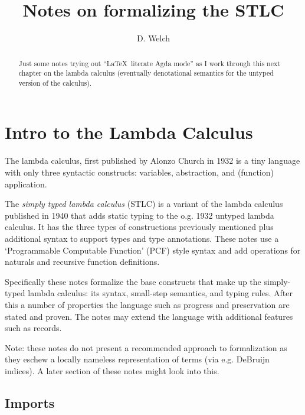 \documentclass[runningheads]{llncs}
\begin{document}
\title{Notes on formalizing the STLC}
\author{D. Welch}
\institute{}
\maketitle

\begin{abstract}
Just some notes trying out ``\LaTeX \ literate Agda mode'' as I work through 
this next chapter on the lambda calculus (eventually denotational semantics for
the untyped version of the calculus).
\end{abstract}

\section{Intro to the Lambda Calculus} 

The lambda calculus, first published by Alonzo Church in 1932 is a tiny language 
with only three syntactic constructs: variables, abstraction, and (function) 
application. 

The \textit{simply typed lambda calculus} (STLC) is a variant of the lambda 
calculus published in 1940 that adds static typing to the o.g. 1932 untyped 
lambda calculus. It has the three types of constructions previously mentioned 
plus additional syntax to support types and type annotations. These notes use a 
`Programmable Computable Function' (PCF) style syntax and add operations for 
naturals and recursive function definitions.

Specifically these notes formalize the base constructs that make up the 
simply-typed lambda calculus: its syntax, small-step semantics, and typing 
rules. After this a number of properties the language such as progress and 
preservation are stated and proven. The notes may extend the language with 
additional features such as records.

Note: these notes do not present a recommended approach to formalization as 
they eschew a locally nameless representation of terms (via e.g. DeBruijn 
indices). A later section of these notes might look into this. 

\subsection{Imports}
\end{document}
